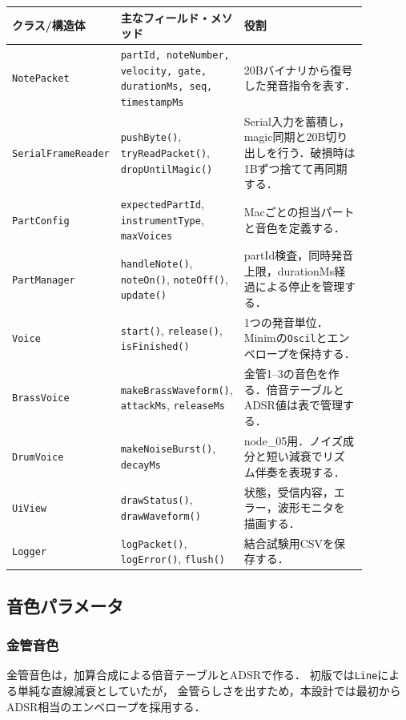 \documentclass[a4paper,11pt]{jsarticle}
\begin{document}
\begin{longtable}{p{0.21\linewidth}p{0.31\linewidth}p{0.36\linewidth}}
\hline
クラス/構造体 & 主なフィールド・メソッド & 役割 \\
\hline
\endhead
\texttt{NotePacket} &
\texttt{partId, noteNumber, velocity, gate, durationMs, seq, timestampMs} &
20Bバイナリから復号した発音指令を表す． \\
\hline
\texttt{SerialFrameReader} &
\texttt{pushByte()}, \texttt{tryReadPacket()}, \texttt{dropUntilMagic()} &
Serial入力を蓄積し，magic同期と20B切り出しを行う．破損時は1Bずつ捨てて再同期する． \\
\hline
\texttt{PartConfig} &
\texttt{expectedPartId}, \texttt{instrumentType}, \texttt{maxVoices} &
Macごとの担当パートと音色を定義する． \\
\hline
\texttt{PartManager} &
\texttt{handleNote()}, \texttt{noteOn()}, \texttt{noteOff()}, \texttt{update()} &
partId検査，同時発音上限，durationMs経過による停止を管理する． \\
\hline
\texttt{Voice} &
\texttt{start()}, \texttt{release()}, \texttt{isFinished()} &
1つの発音単位．Minimの\texttt{Oscil}とエンベロープを保持する． \\
\hline
\texttt{BrassVoice} &
\texttt{makeBrassWaveform()}, \texttt{attackMs}, \texttt{releaseMs} &
金管1--3の音色を作る．倍音テーブルとADSR値は表で管理する． \\
\hline
\texttt{DrumVoice} &
\texttt{makeNoiseBurst()}, \texttt{decayMs} &
node\_05用．ノイズ成分と短い減衰でリズム伴奏を表現する． \\
\hline
\texttt{UiView} &
\texttt{drawStatus()}, \texttt{drawWaveform()} &
状態，受信内容，エラー，波形モニタを描画する． \\
\hline
\texttt{Logger} &
\texttt{logPacket()}, \texttt{logError()}, \texttt{flush()} &
結合試験用CSVを保存する． \\
\hline
\end{longtable}

\subsection{音色パラメータ}

\subsubsection{金管音色}

金管音色は，加算合成による倍音テーブルとADSRで作る．
初版では\texttt{Line}による単純な直線減衰としていたが，
金管らしさを出すため，本設計では最初からADSR相当のエンベロープを採用する．
\end{document}

